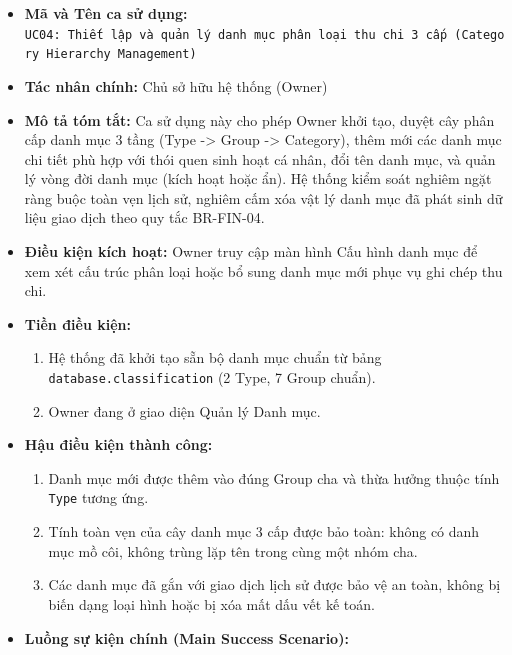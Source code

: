\documentclass[11pt,a4paper]{article}
\providecommand{\tightlist}{
  \setlength{\itemsep}{0pt}\setlength{\parskip}{0pt}}
\begin{document}
\begin{itemize}
\tightlist
\item
  \textbf{Mã và Tên ca sử dụng:}
  \texttt{UC04:\ Thiết\ lập\ và\ quản\ lý\ danh\ mục\ phân\ loại\ thu\ chi\ 3\ cấp\ (Category\ Hierarchy\ Management)}
\item
  \textbf{Tác nhân chính:} Chủ sở hữu hệ thống (Owner)
\item
  \textbf{Mô tả tóm tắt:} Ca sử dụng này cho phép Owner khởi tạo, duyệt
  cây phân cấp danh mục 3 tầng (Type -\textgreater{} Group
  -\textgreater{} Category), thêm mới các danh mục chi tiết phù hợp với
  thói quen sinh hoạt cá nhân, đổi tên danh mục, và quản lý vòng đời
  danh mục (kích hoạt hoặc ẩn). Hệ thống kiểm soát nghiêm ngặt ràng buộc
  toàn vẹn lịch sử, nghiêm cấm xóa vật lý danh mục đã phát sinh dữ liệu
  giao dịch theo quy tắc BR-FIN-04.
\item
  \textbf{Điều kiện kích hoạt:} Owner truy cập màn hình Cấu hình danh
  mục để xem xét cấu trúc phân loại hoặc bổ sung danh mục mới phục vụ
  ghi chép thu chi.
\item
  \textbf{Tiền điều kiện:}

  \begin{enumerate}
  \def\labelenumi{\arabic{enumi}.}
  \tightlist
  \item
    Hệ thống đã khởi tạo sẵn bộ danh mục chuẩn từ bảng
    \texttt{database.classification} (2 Type, 7 Group chuẩn).
  \item
    Owner đang ở giao diện Quản lý Danh mục.
  \end{enumerate}
\item
  \textbf{Hậu điều kiện thành công:}

  \begin{enumerate}
  \def\labelenumi{\arabic{enumi}.}
  \tightlist
  \item
    Danh mục mới được thêm vào đúng Group cha và thừa hưởng thuộc tính
    \texttt{Type} tương ứng.
  \item
    Tính toàn vẹn của cây danh mục 3 cấp được bảo toàn: không có danh
    mục mồ côi, không trùng lặp tên trong cùng một nhóm cha.
  \item
    Các danh mục đã gắn với giao dịch lịch sử được bảo vệ an toàn, không
    bị biến dạng loại hình hoặc bị xóa mất dấu vết kế toán.
  \end{enumerate}
\item
  \textbf{Luồng sự kiện chính (Main Success Scenario):}


\end{itemize}
\end{document}
